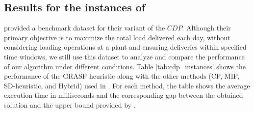 \documentclass{article}
\begin{document}
\subsection{Results for the instances of \cite{kinable2014concrete}}

\cite{kinable2014concrete} provided a benchmark dataset for their variant of the $CDP$. Although their primary objective is to maximize the total load delivered each day, without considering loading operations at a plant and ensuring deliveries within specified time windows, we still use this dataset to analyze and compare the performance of our algorithm under different conditions. Table \ref*{tab:cdp_instances} shows the performance of the GRASP heuristic along with the other methods (CP, MIP, SD-heuristic, and Hybrid) used in \cite{kinable2014concrete}.  For each method, the table shows the average execution time in milliseconds and the corresponding gap between the obtained solution and the upper bound provided by \cite{kinable2014concrete}.
\end{document}
